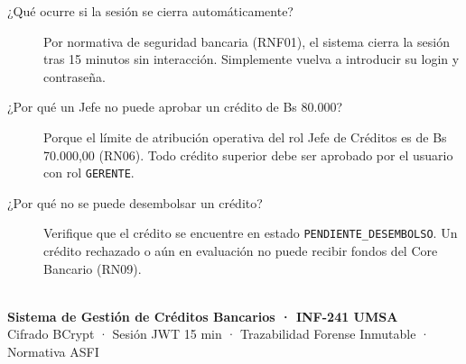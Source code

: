 \documentclass[11pt,letterpaper]{article}
\begin{document}
\begin{description}
    \item[¿Qué ocurre si la sesión se cierra automáticamente?]  
    Por normativa de seguridad bancaria (RNF01), el sistema cierra la sesión tras 15 minutos sin interacción. Simplemente vuelva a introducir su login y contraseña.
    
    \item[¿Por qué un Jefe no puede aprobar un crédito de Bs 80.000?]  
    Porque el límite de atribución operativa del rol Jefe de Créditos es de Bs 70.000,00 (RN06). Todo crédito superior debe ser aprobado por el usuario con rol \texttt{GERENTE}.
    
    \item[¿Por qué no se puede desembolsar un crédito?]  
    Verifique que el crédito se encuentre en estado \texttt{PENDIENTE\_DESEMBOLSO}. Un crédito rechazado o aún en evaluación no puede recibir fondos del Core Bancario (RN09).
\end{description}

\vspace{1cm}
\begin{center}
    \hrulefill\\
    \small\textbf{Sistema de Gestión de Créditos Bancarios · INF-241 UMSA}\\
    \small Cifrado BCrypt · Sesión JWT 15 min · Trazabilidad Forense Inmutable · Normativa ASFI
\end{center}
\end{document}
